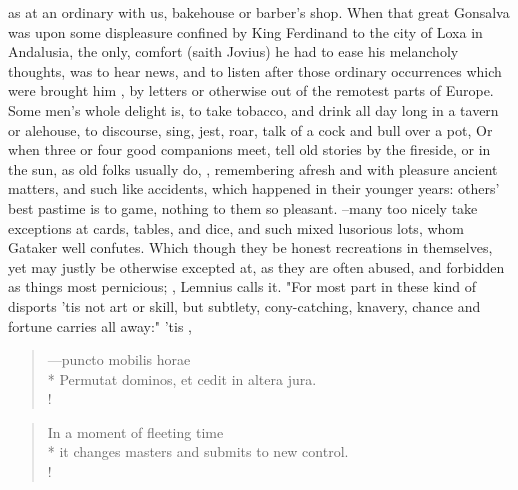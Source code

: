 {as at an ordinary with us, bakehouse or barber's shop. When that great Gonsalva was upon some displeasure confined by King Ferdinand to the city of Loxa in Andalusia, the only, comfort (saith Jovius) he had to ease his melancholy thoughts, was to hear news, and to listen after those ordinary occurrences which were brought him , by letters or otherwise out of the remotest parts of Europe. Some men's whole delight is, to take tobacco, and drink all day long in a tavern or alehouse, to discourse, sing, jest, roar, talk of a cock and bull over a pot, \etc{} Or when three or four good companions meet, tell old stories by the fireside, or in the sun, as old folks usually do, , remembering afresh and with pleasure ancient matters, and such like accidents, which happened in their younger years: others' best pastime is to game, nothing to them so pleasant.  --many too nicely take exceptions at cards, tables, and dice, and such mixed lusorious lots, whom Gataker well confutes. Which though they be honest recreations in themselves, yet may justly be otherwise excepted at, as they are often abused, and forbidden as things most pernicious; , Lemnius calls it. "For most part in these kind of disports 'tis not art or skill, but subtlety, cony-catching, knavery, chance and fortune carries all away:" 'tis ,
%
\begin{latin}%
\begin{verse}%
---puncto mobilis horae\\*
Permutat dominos, et cedit in altera jura.\\!
\end{verse}%
\end{latin}%
\translationrule%
\begin{verse}%
In a moment of fleeting time\\*
it changes masters and submits to new control.\\!
\end{verse}%


}
